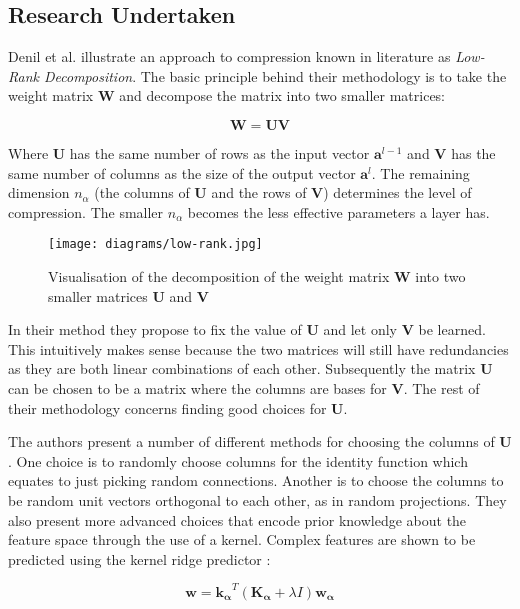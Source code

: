 \documentclass[journal]{IEEEtran}
\begin{document}
\subsection{Research Undertaken}
Denil et al. \cite{denil2013predicting} illustrate an approach to compression known in literature as \textit{Low-Rank Decomposition}. The basic principle behind their methodology is to take the weight matrix $\bm{W}$ and decompose the matrix into two smaller matrices:

\begin{equation}
\label{eq:low-rank}
	\bm{W} = \bm{UV}
\end{equation}

Where $\bm{U}$ has the same number of rows as the input vector $\bm{a}^{l-1}$ and $\bm{V}$ has the same number of columns as the size of the output vector $\bm{a}^{l}$. The remaining dimension $n_\alpha$ (the columns of $\bm{U}$ and the rows of $\bm{V}$) determines the level of compression. The smaller $n_\alpha$ becomes the less effective parameters a layer has. 

\begin{figure}[h!]
\centering
\texttt{[image: diagrams/low-rank.jpg]}
\caption{Visualisation of the decomposition of the weight matrix $\bm{W}$ into two smaller matrices $\bm{U}$ and $\bm{V}$}
\label{fig:low-rank}
\end{figure}


In their method they propose to fix the value of $\bm{U}$ and let only $\bm{V}$ be learned. This intuitively makes sense because the two matrices will still have redundancies as they are both linear combinations of each other. Subsequently the matrix $\bm{U}$ can be chosen to be a matrix where the columns are bases for $\bm{V}$. The rest of their methodology concerns finding good choices for $\bm{U}$.

The authors present a number of different methods for choosing the columns of $\bm{U}$. One choice is to randomly choose columns for the identity function which equates to just picking random connections. Another is to choose the  columns to be random unit vectors orthogonal to each other, as in random projections. They also present more advanced choices that encode prior knowledge about the feature space through the use of a kernel. Complex features are shown to be predicted using the kernel ridge predictor \cite{welling2013kernel}:

\begin{equation}
\label{eq:ridge-predictor}
	\bm{w} = \bm{k_\alpha}^T(\bm{K_\alpha} + \lambda I)\bm{w_\alpha}
\end{equation}
\end{document}
